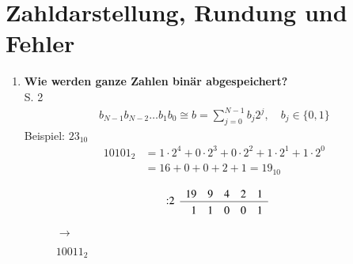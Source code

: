 \section{Zahldarstellung, Rundung und Fehler}
	\begin{enumerate}
		\item \textbf{Wie werden ganze Zahlen binär abgespeichert?}\\
			S. 2
			\begin{align*}
				b_{N-1}b_{N-2}\dots b_{1}b_{0} \cong b = \sum_{j=0}^{N-1}b_j2^j, \quad b_j\in\{0,1\}
			\end{align*}
			Beispiel: \(23_{10}\)
			\begin{align*}
					10101_2 &= 1\cdot2^4+0\cdot2^3+0\cdot2^2+1\cdot2^1+1\cdot2^0 \\
					      &= 16+0+0+2+1 = 19_{10}
			\end{align*} \vspace{-1cm}
			\begin{figure}[htbp]
				\centering
				\begin{minipage}{0.3\textwidth}
					\centering
					$$\begin{array}{rrrrrr}
					\multirow{2}{*}{:2} & 19 & 9 & 4 & 2 & 1 \\
					\cline{2-6}
					 \rule{0pt}{2.5ex} & 1 &  1 & 0 & 0 & 1
					\end{array}$$
				\end{minipage}\hspace{-0.5cm}
				\begin{minipage}{0.01\textwidth}
					\centering
					\vspace{0.3cm}
					\(\rightarrow\)
				\end{minipage}\hspace{-0.7cm}
				\begin{minipage}{0.2\textwidth}
					\centering
					\vspace{0.3cm}
					\(10011_2\)
				\end{minipage}
			\end{figure}
			

\end{enumerate}
